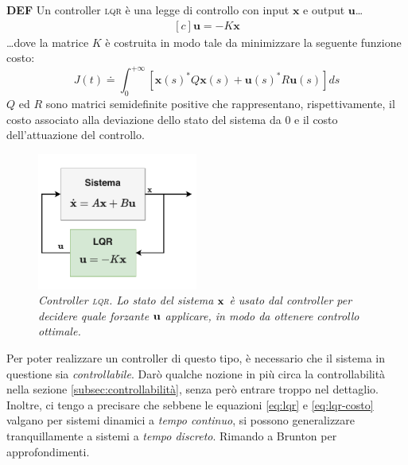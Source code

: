 \begin{framed}
  \textbf{DEF}
  Un controller \textsc{lqr} è una legge di controllo con input $\mathbf x$ e output $\mathbf u$\ldots
  \begin{equation}
    \begin{aligned}[c]
      \mathbf u = -K \mathbf x
    \end{aligned}
    \label{eq:lqr}
  \end{equation}
  \ldots dove la matrice $K$ è costruita in modo tale da minimizzare la seguente funzione costo:
  \begin{equation}
    J(t) \doteq
      \int_0^{+\infty} \left[ \mathbf{x} (s)^* Q \mathbf {x} (s) + \mathbf {u} (s)^* R \mathbf {u} (s) \right] ds
    \label{eq:lqr-costo}
  \end{equation}
  $Q$ ed $R$ sono matrici semidefinite positive che rappresentano, rispettivamente, il costo associato alla
  deviazione dello stato del sistema da $0$ e il costo dell'attuazione del controllo.
\end{framed}

\begin{figure}[h]
  \includegraphics[width=0.47\textwidth]{../assets/diagramma lqr.pdf}
  \caption{\emph{Controller \textsc{lqr}. Lo stato del sistema $\bf x$ è usato dal controller per decidere quale forzante
  $\bf u$ applicare, in modo da ottenere controllo ottimale.}}
  \label{fig:lqr}
\end{figure}

Per poter realizzare un controller di questo tipo, è necessario che il sistema in questione sia \emph{controllabile}.
Darò qualche nozione in più circa la controllabilità nella sezione \ref{subsec:controllabilità}, senza però entrare
troppo nel dettaglio.
Inoltre, ci tengo a precisare che sebbene le equazioni \eqref{eq:lqr} e \eqref{eq:lqr-costo}
valgano per sistemi dinamici a \emph{tempo continuo}, si possono generalizzare tranquillamente a sistemi
a \emph{tempo discreto}.
Rimando a Brunton\cite{brunton2019data} per approfondimenti.

